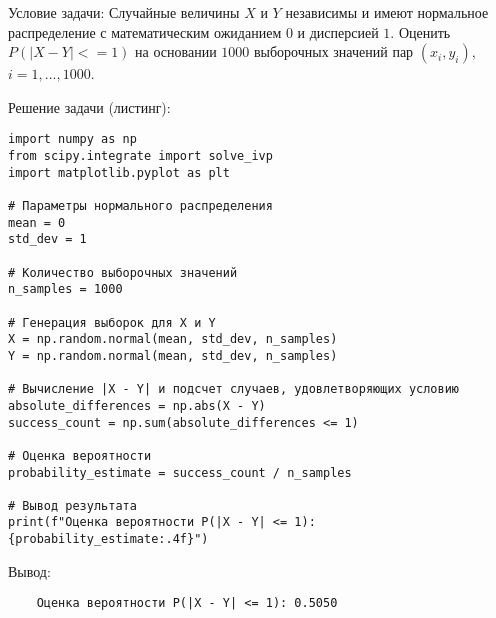 Условие задачи: Случайные величины $X$ и $Y$ независимы и имеют нормальное распределение с математическим ожиданием $0$ и дисперсией $1$. Оценить $P(|X-Y|<=1)$ на основании $1000$ выборочных значений пар $(x_{i}, y_{i})$, $i=1,...,1000$.

Решение задачи (листинг):

\begin{verbatim}
import numpy as np
from scipy.integrate import solve_ivp
import matplotlib.pyplot as plt

# Параметры нормального распределения
mean = 0
std_dev = 1

# Количество выборочных значений
n_samples = 1000

# Генерация выборок для X и Y
X = np.random.normal(mean, std_dev, n_samples)
Y = np.random.normal(mean, std_dev, n_samples)

# Вычисление |X - Y| и подсчет случаев, удовлетворяющих условию
absolute_differences = np.abs(X - Y)
success_count = np.sum(absolute_differences <= 1)

# Оценка вероятности
probability_estimate = success_count / n_samples

# Вывод результата
print(f"Оценка вероятности P(|X - Y| <= 1): {probability_estimate:.4f}")
\end{verbatim}

Вывод:
\begin{verbatim}
    Оценка вероятности P(|X - Y| <= 1): 0.5050
\end{verbatim}